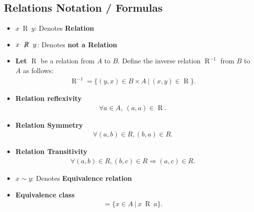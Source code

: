 \documentclass{report}
\begin{document}
      \bigbreak \noindent \bigbreak \noindent 
      \subsection{Relations Notation / Formulas}
      \bigbreak \noindent 
      \begin{itemize}
        \item $x\ \mathrel{R}\ y $: Denotes \textbf{Relation}        
        \item $x\ \not \mathrel{R}\ y $: Denotes \textbf{not a Relation}        
        \item \textbf{Let $\mathrel{R}$} be a relation from $A$ to $B$. Define the inverse relation $\mathrel{R}^{-1}$ from $B$ to $A$ as follows:
            \begin{align*}
                \mathrel{R}^{-1} = \{(y,x) \in B \times A\ |\ (x,y) \in \mathrel{R}\}
            .\end{align*}
        \item \textbf{Relation reflexivity}
          \begin{align*}
            \forall a \in A,\ (a,a) \in \mathrel{R}
          .\end{align*}
        \item \textbf{Relation Symmetry}
          \begin{align*}
            \forall (a, b) \in R, (b, a) \in R
          .\end{align*}
        \item \textbf{Relation Transitivity}
          \begin{align*}
            \forall (a, b) \in R, (b, c) \in R \Rightarrow (a, c) \in R
          .\end{align*}
        \item $x \sim y$: Denotes \textbf{Equivalence relation}
        \item \textbf{Equivalence class}
          \begin{align*}
            [a] = \{x \in A\ |\ x\ \mathrel{R}\ a\}
          .\end{align*}
      \end{itemize}

      \pagebreak \bigbreak \noindent 
\end{document}
